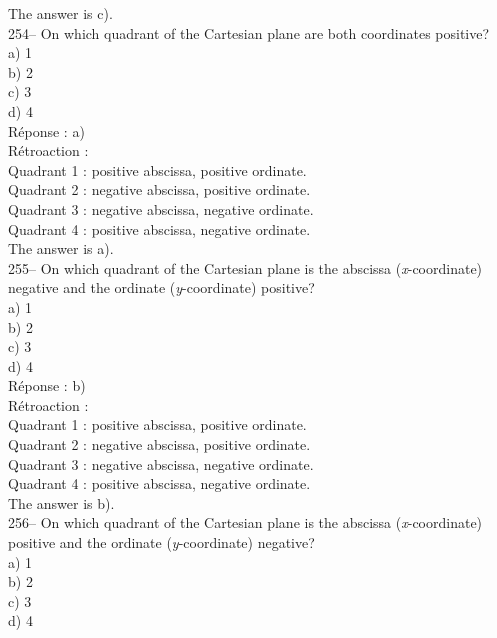 \documentclass[letterpaper, 12pt]{article}
\begin{document}
The answer is c).\\

254-- On which quadrant of the Cartesian plane are both coordinates
positive?\\

a) 1\\
b) 2 \\
c) 3\\
d) 4\\

R\'eponse : a)\\

R\'etroaction : \\
Quadrant 1 : positive abscissa, positive ordinate.\\
Quadrant 2 : negative abscissa, positive ordinate.\\
Quadrant 3 : negative abscissa, negative ordinate.\\
Quadrant 4 : positive abscissa, negative ordinate.\\

The answer is a).\\

255-- On which quadrant of the Cartesian plane is the abscissa
(\emph{x}-coordinate) negative and the ordinate
(\emph{y}-coordinate)
positive?\\

a) 1\\
b) 2 \\
c) 3\\
d) 4\\

R\'eponse : b)\\

R\'etroaction : \\
Quadrant 1 : positive abscissa, positive ordinate.\\
Quadrant 2 : negative abscissa, positive ordinate.\\
Quadrant 3 : negative abscissa, negative ordinate.\\
Quadrant 4 : positive abscissa, negative ordinate.\\

The answer is b).\\

256-- On which quadrant of the Cartesian plane is the abscissa
(\emph{x}-coordinate) positive and the ordinate
(\emph{y}-coordinate)
negative?\\

a) 1\\
b) 2 \\
c) 3\\
d) 4\\
\end{document}
